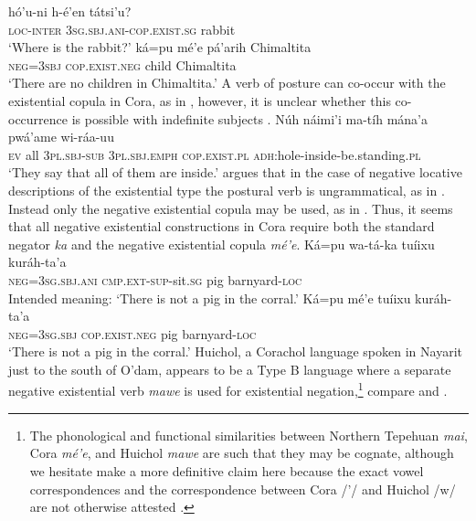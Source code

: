 \documentclass[output=paper]{langsci/langscibook}
\begin{document}
\ea
\label{ex:odam-crposcop}
\gll hó’u-ni h-é’en tátsi'u?\\
\textsc{loc-inter} \textsc{3sg.sbj.ani-cop.exist.sg} rabbit\\
\glt `Where is the rabbit?' \citep[139]{vazquez2013}
\z
\ea
\label{ex:odam-crnokids}
\gll ká=pu mé’e pá’arih Chimaltita\\
\textsc{neg=3sbj} \textsc{cop.exist.neg} child Chimaltita\\
\glt ‘There are no children in Chimaltita.’ \citep[165]{vazquez2013}
\z
A verb of posture can co-occur with the existential copula in Cora, as in , however, it is unclear whether this co-occurrence is possible with indefinite subjects \citet[see][180ff]{vazquez2013}.
\ea 
\label{ex:odam-allinside}
\gll Núh 	náimi’i 	ma-tíh 		mána’a pwá’ame 	wi-ráa-uu\\
\textsc{ev} all	\textsc{3pl.sbj-sub} \textsc{3pl.sbj.emph} \textsc{cop.exist.pl} \textsc{adh}:hole-inside-be.standing.\textsc{pl}\\
\glt ‘They say that all of them are inside.’
\citep[181]{vazquez2013}
\z 
\citep[181]{vazquez2013} argues that in the case of negative locative descriptions of the existential type the postural verb is ungrammatical, as in . Instead only the negative existential copula may be used, as in . Thus, it seems that all negative existential constructions in Cora require both the standard negator \emph{ka} and the negative existential copula \emph{mé'e}.
\ea
\label{ex:odam-coraungram}
\gll *Ká=pu 		wa-tá-ka 			tuíixu 	kuráh-ta’a\\
\textsc{neg=3sg.sbj.ani} 	\textsc{cmp.ext-sup}-sit.\textsc{sg} 	pig 	barnyard-\textsc{loc}\\ 
\glt Intended meaning: ‘There is not a pig in the corral.’ \citep[181]{vazquez2013}
\z 
\ea
\label{ex:odam-corapig}
\gll Ká=pu 	mé’e 			tuíixu 		kuráh-ta’a\\
\textsc{neg=3sg.sbj} 	\textsc{cop.exist.neg} 	pig 		barnyard-\textsc{loc}\\
\glt ‘There is not a pig in the corral.’ \citep[181]{vazquez2013}
\z 
Huichol, a Corachol language spoken in Nayarit just to the south of O’dam, appears to be a Type B language where a separate negative existential verb \emph{mawe} is used for existential negation,\footnote{The phonological and functional similarities between Northern Tepehuan \emph{mai}, Cora \emph{mé'e}, and Huichol \emph{mawe} are such that they may be cognate, although we hesitate make a more definitive claim here because the exact vowel correspondences and the correspondence between Cora /'/ and Huichol /w/ are not otherwise attested \citep{stubbs2011}.} compare  and .
\end{document}
